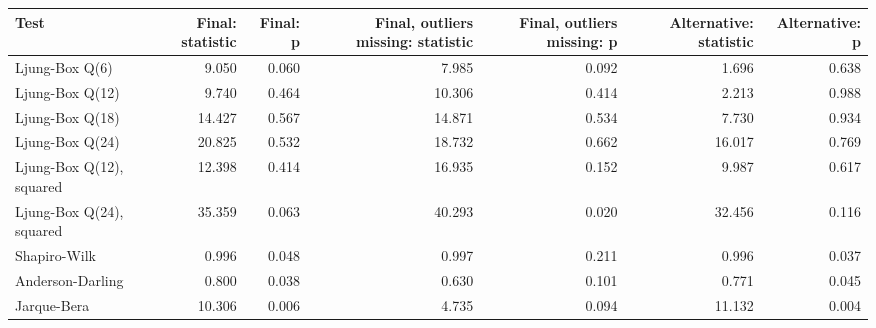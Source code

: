 
\begin{tabular}[t]{lrrrrrr}
\toprule
Test & Final: statistic & Final: p & Final, outliers missing: statistic & Final, outliers missing: p & Alternative: statistic & Alternative: p\\
\midrule
Ljung-Box Q(6) & 9.050 & 0.060 & 7.985 & 0.092 & 1.696 & 0.638\\
Ljung-Box Q(12) & 9.740 & 0.464 & 10.306 & 0.414 & 2.213 & 0.988\\
Ljung-Box Q(18) & 14.427 & 0.567 & 14.871 & 0.534 & 7.730 & 0.934\\
Ljung-Box Q(24) & 20.825 & 0.532 & 18.732 & 0.662 & 16.017 & 0.769\\
Ljung-Box Q(12), squared & 12.398 & 0.414 & 16.935 & 0.152 & 9.987 & 0.617\\
Ljung-Box Q(24), squared & 35.359 & 0.063 & 40.293 & 0.020 & 32.456 & 0.116\\
Shapiro-Wilk & 0.996 & 0.048 & 0.997 & 0.211 & 0.996 & 0.037\\
Anderson-Darling & 0.800 & 0.038 & 0.630 & 0.101 & 0.771 & 0.045\\
Jarque-Bera & 10.306 & 0.006 & 4.735 & 0.094 & 11.132 & 0.004\\
\bottomrule
\end{tabular}
